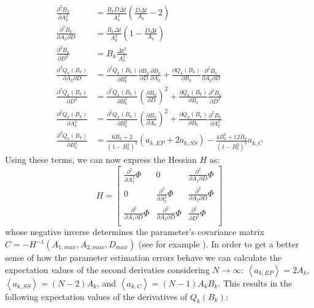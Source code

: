 \documentclass[%
 reprint,
 amsmath,amssymb,
 aps,
]{revtex4-1}
\begin{document}
\begin{equation}
	\begin{aligned}
		\frac{\partial^{2} B_{k}}{\partial A_{k}^{2}} &=\frac{B_{k}D\Delta t}{A_{k}^{3}}\left(\frac{D\Delta t}{A_{k}}-2\right) \\
		\frac{\partial^{2} B_{k}}{\partial A_{k}\partial D} & = \frac{B_{k}\Delta t}{A_{k}^{2}}\left(1-\frac{D\Delta t}{A_{k}}\right)\\
		\frac{\partial^{2} B_{k}}{\partial D^{2}} &= B_{k}\frac{\Delta t^{2}}{A_{k}^{2}}\\
		\frac{\partial^{2} Q_{k}(B_{k})}{\partial A_{k}\partial D} &= 
		\frac{\partial^{2} Q_{k}(B_{k})}{\partial B_{k}^{2}}\frac{\partial B_{k}}{\partial D}\frac{\partial B_{k}}{\partial A_{k}}
		+\frac{\partial Q_{k}(B_{k})}{\partial B_{k}}\frac{\partial^{2} B_{k}}{\partial A_{k}\partial D}\\
		\frac{\partial^{2}Q_{k}(B_{k})}{\partial D^{2}} &= \frac{\partial^{2}Q_{k}(B_{k})}{\partial B_{k}^{2}}\left(\frac{\partial B_{k}}{\partial D}\right)^{2}
		+\frac{\partial Q_{k}(B_{k})}{\partial B_{k}}\frac{\partial^{2}B_{k}}{\partial D^{2}}\\
		\frac{\partial^{2}Q_{k}(B_{k})}{\partial A_{k}^{2}} &= 
		\frac{\partial^{2}Q_{k}(B_{k})}{\partial B_{k}^{2}}\left(\frac{\partial B_{k}}{\partial A_{k}}\right)^{2}
		+\frac{\partial Q_{k}(B_{k})}{\partial B_{k}}\frac{\partial^{2}B_{k}}{\partial A_{k}^{2}}\\
		\frac{\partial^{2}Q_{k}(B_{k})}{\partial B_{k}^{2}} &= \frac{6B_{k}+2}{(1-B_{k}^{2})^{3}}\left(a_{k,EP}+2a_{k,SS}\right)
		-\frac{4B_{k}^{3}+12B_{k}}{(1-B_{k}^{2})^{3}}a_{k,C}
	\end{aligned}
\end{equation}
Using these terms, we can now express the Hessian $H$ as:
\begin{equation}H=
\begin{bmatrix} 
\frac{\partial^{2}}{\partial A_{1}^2}\Phi & 0 & \frac{\partial^{2}}{\partial A_{1}\partial D}\Phi \\
0 & \frac{\partial^{2}}{\partial A_{2}^2}\Phi & \frac{\partial^{2}}{\partial A_{2}\partial D}\Phi \\
\frac{\partial^{2}}{\partial A_{1}\partial D}\Phi & \frac{\partial^{2}}{\partial A_{2}\partial D}\Phi & \frac{\partial^{2}}{\partial D^2}\Phi\\
\end{bmatrix}
\end{equation}
whose negative inverse determines the parameter's covariance matrix $C = -H^{-1}(A_{1,max},A_{2,max},D_{max})$ (see for example \cite{RN42}). In order to get a better sense of how the parameter estimation errors behave we can calculate the expectation values of the second derivaties considering $N\rightarrow \infty$: $\left\langle a_{k,EP} \right\rangle=2A_{k}$,$\left\langle a_{k,SS} \right\rangle=(N-2)A_{k}$, and $\left\langle a_{k,C} \right\rangle=(N-1)A_{k}B_{k}$.  This results in the following expectation values of the derivatives of $Q_{k}(B_{k})$:
\end{document}
